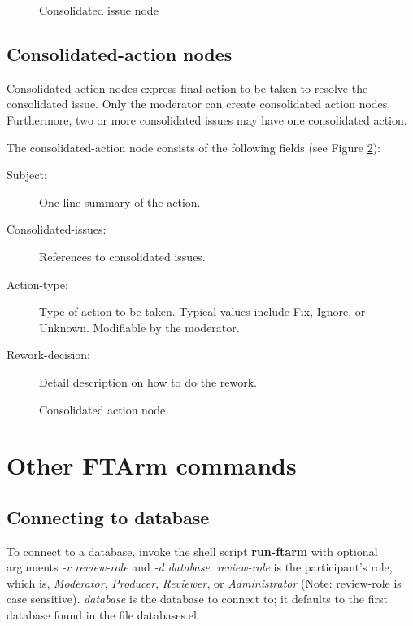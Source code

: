 \begin{figure}[htpb]
  {\centerline{}}
  \caption{Consolidated issue node}
  \label{consolidated-issue}
\end{figure}

\subsection {Consolidated-action nodes}
Consolidated action nodes express final action to be taken to resolve
the consolidated issue. Only the moderator can create consolidated action 
nodes. Furthermore, two or more consolidated issues may have one
consolidated action. 

\noindent The consolidated-action node consists of the following
fields (see Figure \ref{consolidated-action}):
\begin{description}
\item [Subject:] One line summary of the action.

\item [Consolidated-issues:] References to consolidated issues.

\item [Action-type:] Type of action to be taken. Typical values include
Fix, Ignore, or Unknown. Modifiable by the moderator.

\item [Rework-decision:]  Detail description on how to do the
 rework.
\end{description}

\begin{figure}[htpb]
  {\centerline{}}
  \caption{Consolidated action node}
  \label{consolidated-action}
\end{figure}

\section {Other FTArm commands}
\subsection {Connecting to database}
To connect to a database, invoke the shell script {\bf run-ftarm}
with optional arguments {\it-r review-role} and {\it -d database}. 
{\it review-role} is the participant's role, which is, 
{\it Moderator}, {\it Producer}, {\it Reviewer}, or {\it
Administrator} (Note: review-role is case sensitive).
{\it database} is the database to connect to; it defaults to the first
database found in the file databases.el.

